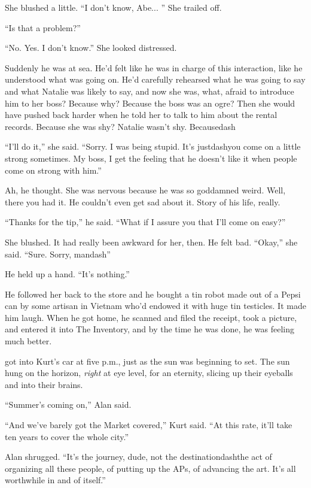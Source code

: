 She blushed a little.  ``I don't know, Abe...  '' She trailed off.

``Is that a problem?''

``No.  Yes.  I don't know.'' She looked distressed.

Suddenly he was at sea.  He'd felt like he was in charge of this
interaction, like he understood what was going on.  He'd carefully
rehearsed what he was going to say and what Natalie was likely to say,
and now she was, what, afraid to introduce him to her boss?  Because
why?  Because the boss was an ogre?  Then she would have pushed back
harder when he told her to talk to him about the rental records. 
Because she was shy?  Natalie wasn't shy.  Becausedash{}

``I'll do it,'' she said.  ``Sorry.  I was being stupid.  It's
justdash{}you come on a little strong sometimes.  My boss, I get the
feeling that he doesn't like it when people come on strong with him.''

Ah, he thought.  She was nervous because he was so goddamned weird. 
Well, there you had it.  He couldn't even get sad about it.  Story of
his life, really.

``Thanks for the tip,'' he said.  ``What if I assure you that I'll
come on easy?''

She blushed.  It had really been awkward for her, then.  He felt bad. 
``Okay,'' she said.  ``Sure.  Sorry, mandash{}''

He held up a hand.  ``It's nothing.''

He followed her back to the store and he bought a tin robot made out
of a Pepsi can by some artisan in Vietnam who'd endowed it with huge
tin testicles.  It made him laugh.  When he got home, he scanned and
filed the receipt, took a picture, and entered it into The Inventory,
and by the time he was done, he was feeling much better.

 got into Kurt's car at five p.m., just as the sun was beginning
to set.  The sun hung on the horizon, \textit{right} at eye level, for
an eternity, slicing up their eyeballs and into their brains.

``Summer's coming on,'' Alan said.

``And we've barely got the Market covered,'' Kurt said.  ``At this
rate, it'll take ten years to cover the whole city.''

Alan shrugged.  ``It's the journey, dude, not the destinationdash{}the
act of organizing all these people, of putting up the APs, of
advancing the art.  It's all worthwhile in and of itself.''

